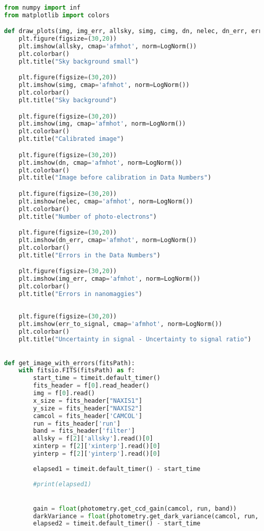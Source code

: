 \begin{lstlisting}[language=Python]
from numpy import inf
from matplotlib import colors

def draw_plots(img, img_err, allsky, simg, cimg, dn, nelec, dn_err, err_to_signal):
    plt.figure(figsize=(30,20))
    plt.imshow(allsky, cmap='afmhot', norm=LogNorm())
    plt.colorbar()
    plt.title("Sky background small")

    plt.figure(figsize=(30,20))
    plt.imshow(simg, cmap='afmhot', norm=LogNorm())
    plt.colorbar()
    plt.title("Sky background")

    plt.figure(figsize=(30,20))
    plt.imshow(img, cmap='afmhot', norm=LogNorm())
    plt.colorbar()
    plt.title("Calibrated image")

    plt.figure(figsize=(30,20))
    plt.imshow(dn, cmap='afmhot', norm=LogNorm())
    plt.colorbar()
    plt.title("Image before calibration in Data Numbers")

    plt.figure(figsize=(30,20))
    plt.imshow(nelec, cmap='afmhot', norm=LogNorm())
    plt.colorbar()
    plt.title("Number of photo-electrons")

    plt.figure(figsize=(30,20))
    plt.imshow(dn_err, cmap='afmhot', norm=LogNorm())
    plt.colorbar()
    plt.title("Errors in the Data Numbers")

    plt.figure(figsize=(30,20))
    plt.imshow(img_err, cmap='afmhot', norm=LogNorm())
    plt.colorbar()
    plt.title("Errors in nanomaggies")
    
    
    plt.figure(figsize=(30,20))
    plt.imshow(err_to_signal, cmap='afmhot', norm=LogNorm())
    plt.colorbar()
    plt.title("Uncertainty in signal - Uncertainty to signal ratio")
    

def get_image_with_errors(fitsPath):
    with fitsio.FITS(fitsPath) as f:
        start_time = timeit.default_timer()
        fits_header = f[0].read_header()
        img = f[0].read()
        x_size = fits_header["NAXIS1"]
        y_size = fits_header["NAXIS2"]
        camcol = fits_header['CAMCOL']
        run = fits_header['run']
        band = fits_header['filter']    
        allsky = f[2]['allsky'].read()[0]
        xinterp = f[2]['xinterp'].read()[0]
        yinterp = f[2]['yinterp'].read()[0]
        
        elapsed1 = timeit.default_timer() - start_time
        
        #print(elapsed1)


        gain = float(photometry.get_ccd_gain(camcol, run, band))
        darkVariance = float(photometry.get_dark_variance(camcol, run, band))
        elapsed2 = timeit.default_timer() - start_time
        

\end{lstlisting}

